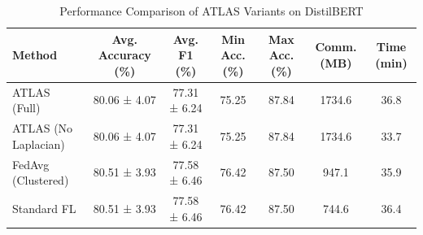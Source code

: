 \begin{table}[!t]
\renewcommand{\arraystretch}{1.2}
\caption{Performance Comparison of ATLAS Variants on DistilBERT}
\label{tab:main_results}
\centering
\begin{tabular}{l|cc|cc|cc}
\hline\hline
Method & Avg. Accuracy (\%) & Avg. F1 (\%) & Min Acc. (\%) & Max Acc. (\%) & Comm. (MB) & Time (min) \\
\hline
ATLAS (Full) & 80.06 ± 4.07 & 77.31 ± 6.24 & 75.25 & 87.84 & 1734.6 & 36.8 \\
ATLAS (No Laplacian) & 80.06 ± 4.07 & 77.31 ± 6.24 & 75.25 & 87.84 & 1734.6 & 33.7 \\
FedAvg (Clustered) & 80.51 ± 3.93 & 77.58 ± 6.46 & 76.42 & 87.50 & 947.1 & 35.9 \\
Standard FL & 80.51 ± 3.93 & 77.58 ± 6.46 & 76.42 & 87.50 & 744.6 & 36.4 \\
\hline\hline
\end{tabular}
\end{table}
